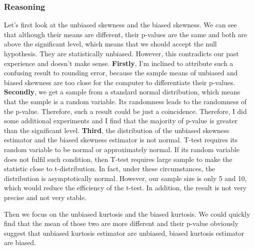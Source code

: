 \documentclass[11pt,en]{elegantpaper}
\begin{document}
\begin{enumerate}[leftmargin = 30pt]
    \subsubsection*{Reasoning}
    Let's first look at the unbiased skewness and the biased skewness. We can see that although their means 
    are different, their p-values are the same and both are above the significant level, which means that 
    we should accept the null hypothesis. They are statistically unbiased. However, this contradicts our 
    past experience and doesn't make sense.
    \newline
    \textbf{Firstly}, I'm inclined to attribute such a confusing result to rounding error, because the sample means 
    of unbiased and biased skewness are too close for the computer to differentiate their p-values.
    \newline
    \textbf{Secondly}, we get a sample from a standard normal distribution, which means that the sample is a 
    random variable. Its randomness leads to the randomness of the p-value. Therefore, such a result could 
    be just a coincidence. Therefore, I did some additional experiments and I find that the majority of 
    p-value is greater than the significant level.
    \newline
    \textbf{Third}, the distribution of the unbiased skewness estimator and the biased skewness estimator is not normal.
     T-test requires its random variable to be normal or approximately normal. If its random variable does 
     not fulfil such condition, then T-test requires large sample to make the statistic close to 
     t-distribution. In fact, under these circumstances, the distribution is asymptotically normal. However, 
     our sample size is only 5 and 10, which would reduce the efficiency of the t-test. In addition, the result is 
     not very precise and not very stable.

     Then we focus on the unbiased kurtosis and the biased kurtosis. We could quickly find that the mean of those 
     two are more different and their p-value obviously suggest that unbiased kurtosis estimator are unbiased,
     biased kurtosis estimator are biased.



\end{enumerate}
\end{document}
